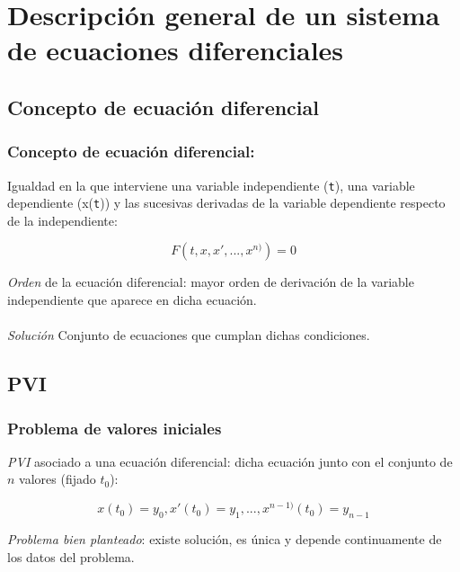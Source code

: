 \documentclass{beamer}
\begin{document}
\section{Descripción general de un sistema de ecuaciones diferenciales}
\subsection{Concepto de ecuación diferencial}
\begin{frame}
	\frametitle{Concepto de ecuación diferencial:}
	
	Igualdad en la que interviene una variable independiente (\texttt{t}), una variable dependiente (x(\texttt{t})) y las sucesivas derivadas de la variable dependiente respecto de la independiente:
	
	$$
	F(t,x,x', ..., x^{n)})=0
	$$
	
	\textit{Orden} de la ecuación diferencial: mayor orden de derivación de la variable independiente que aparece en dicha ecuación.\\~\\
	
	\textit{Solución} Conjunto de ecuaciones que cumplan dichas condiciones.
\end{frame}

\subsection{PVI}
\begin{frame}
	\frametitle{Problema de valores iniciales}
	\textit{PVI} asociado a una ecuación diferencial: dicha ecuación junto con el conjunto de $n$ valores (fijado $t_0$):
	
	$$
	x(t_0)=y_0, x'(t_0)=y_1, ...,  x^{n-1)}(t_0)=y_{n-1}
	$$
	
	\textit{Problema bien planteado}: existe solución, es única y depende continuamente de los datos del problema.
	
\end{frame}
\end{document}
